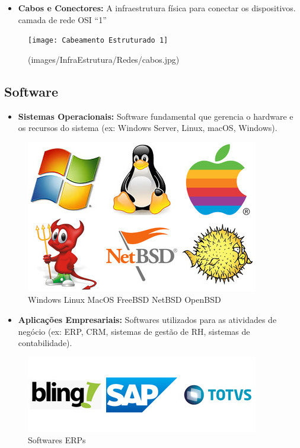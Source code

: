 \documentclass[
]{book}
\providecommand{\tightlist}{%
  \setlength{\itemsep}{0pt}\setlength{\parskip}{0pt}}
\begin{document}
\begin{itemize}
\tightlist
\item
  \textbf{Cabos e Conectores:} A infraestrutura física para conectar os dispositivos. camada de rede OSI ``1''
\end{itemize}

\begin{figure}
\centering
\texttt{[image: Cabeamento Estruturado 1]}
\caption{(images/InfraEstrutura/Redes/cabos.jpg)}
\end{figure}

\subsection{Software}\label{software}

\begin{itemize}
\tightlist
\item
  \textbf{Sistemas Operacionais:} Software fundamental que gerencia o hardware e os recursos do sistema (ex: Windows Server, Linux, macOS, Windows).
\end{itemize}

\begin{figure}
\centering
\includegraphics{images/InfraEstrutura/software/so.jpg}
\caption{Windows Linux MacOS FreeBSD NetBSD OpenBSD}
\end{figure}

\begin{itemize}
\tightlist
\item
  \textbf{Aplicações Empresariais:} Softwares utilizados para as atividades de negócio (ex: ERP, CRM, sistemas de gestão de RH, sistemas de contabilidade).
\end{itemize}

\begin{figure}
\centering
\includegraphics{images/InfraEstrutura/software/erps.jpg}
\caption{Softwares ERPs}
\end{figure}
\end{document}
